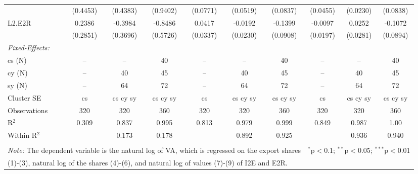 \documentclass[a4paper]{article}
\begin{document}
\begin{table}[h!]
{\begin{tabular}[t]{lccccccccc}
  &(0.4453) & (0.4383) & (0.9402) & (0.0771) & (0.0519) & (0.0837) & (0.0455) & (0.0230) & (0.0838)\\%
L2.E2R&0.2386 & -0.3984 & -0.8486 & 0.0417 & -0.0192 & -0.1399 & -0.0097 & 0.0252 & -0.1072\\
  &(0.2851) & (0.3696) & (0.5726) & (0.0337) & (0.0230) & (0.0908) & (0.0197) & (0.0281) & (0.0894)\\%
\midrule \emph{Fixed-Effects:} &   &   &   &   &   &  \\
cs (N) & -- & -- & 40 & -- & -- & 40 & -- & -- & 40\\
cy (N) & -- & 40 & 45 & -- & 40 & 45 & -- & 40 & 45\\
sy (N) & -- & 64 & 72 & -- & 64 & 72 & -- & 64 & 72\\
\midrule
Cluster SE & cs & cs cy sy & cs cy sy & cs & cs cy sy & cs cy sy & cs & cs cy sy & cs cy sy\\
Observations & 320&320&360&320&320&360&320&320&360\\
R$^2$ & 0.309&0.837&0.995&0.813&0.979&0.999&0.849&0.987&1.00\\
Within R$^2$ & &0.173&0.178&&0.892&0.925&&0.936&0.940\\ \bottomrule \\[-1em]
\multicolumn{7}{l}{\small \textit{Note:} The dependent variable is the natural log of VA, which is regressed on the  export shares}   & \multicolumn{3}{r}{$^{*}$p$<$0.1; $^{**}$p$<$0.05; $^{***}$p$<$0.01} \\ [-0.2em]
\multicolumn{10}{l}{\small \quad \quad \quad (1)-(3), natural log of the shares (4)-(6), and natural log of values (7)-(9) of I2E and E2R.} \\
\end{tabular}
}
\end{table}
\FloatBarrier

\end{document}
